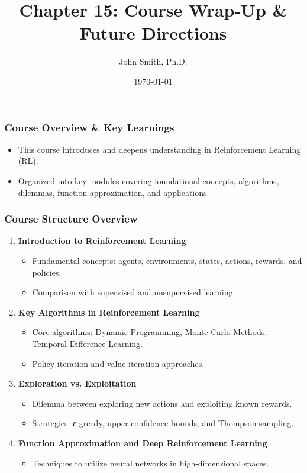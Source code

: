 \documentclass[aspectratio=169]{beamer}
\title[Course Wrap-Up]{Chapter 15: Course Wrap-Up \& Future Directions}
\author[J. Smith]{John Smith, Ph.D.}
\institute[University Name]{Department of Computer Science\\University Name\\Email: email@university.edu}
\date{\today}
\begin{document}
\frame{\titlepage}

\begin{frame}[fragile]
    \frametitle{Course Overview \& Key Learnings}
    \begin{itemize}
        \item This course introduces and deepens understanding in Reinforcement Learning (RL).
        \item Organized into key modules covering foundational concepts, algorithms, dilemmas, function approximation, and applications.
    \end{itemize}
\end{frame}

\begin{frame}[fragile]
    \frametitle{Course Structure Overview}
    \begin{enumerate}
        \item \textbf{Introduction to Reinforcement Learning}
            \begin{itemize}
                \item Fundamental concepts: agents, environments, states, actions, rewards, and policies.
                \item Comparison with supervised and unsupervised learning.
            \end{itemize}
        \item \textbf{Key Algorithms in Reinforcement Learning}
            \begin{itemize}
                \item Core algorithms: Dynamic Programming, Monte Carlo Methods, Temporal-Difference Learning.
                \item Policy iteration and value iteration approaches.
            \end{itemize}
        \item \textbf{Exploration vs. Exploitation}
            \begin{itemize}
                \item Dilemma between exploring new actions and exploiting known rewards.
                \item Strategies: ε-greedy, upper confidence bounds, and Thompson sampling.
            \end{itemize}
        \item \textbf{Function Approximation and Deep Reinforcement Learning}
            \begin{itemize}
                \item Techniques to utilize neural networks in high-dimensional spaces.

\end{itemize}
\end{enumerate}
\end{frame}
\end{document}
